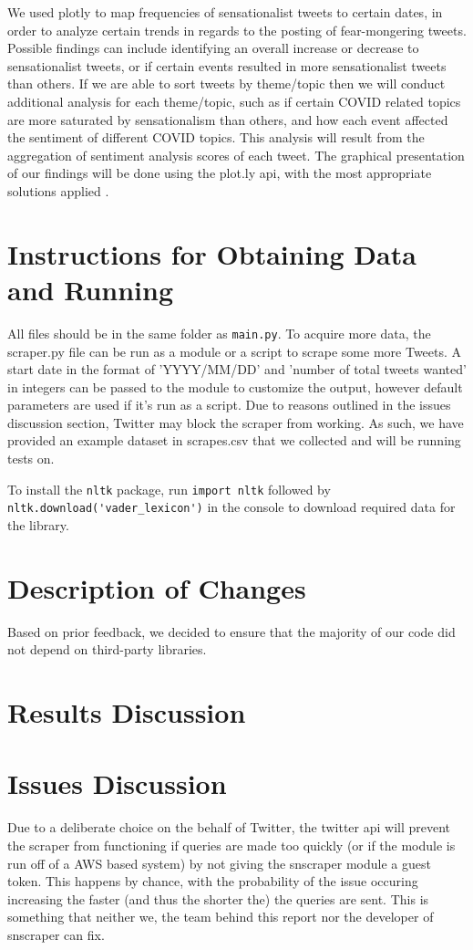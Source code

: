 \documentclass[fontsize=11pt]{article}
\begin{document}
We used plotly to map frequencies of sensationalist tweets to certain dates, in order to analyze certain trends in regards to the posting of fear-mongering tweets. Possible findings can include identifying an overall increase or decrease to sensationalist tweets, or if certain events resulted in more sensationalist tweets than others. If we are able to sort tweets by theme/topic then we will conduct additional analysis for each theme/topic, such as if certain COVID related topics are more saturated by sensationalism than others, and how each event affected the sentiment of different COVID topics. This analysis will result from the aggregation of sentiment analysis scores of each tweet. The graphical presentation of our findings will be done using the plot.ly api, with the most appropriate solutions applied \cite{plotly}.

\section*{Instructions for Obtaining Data and Running}
All files should be in the same folder as \verb|main.py|. To acquire more data, the scraper.py file can be run as a module or a script to scrape some more Tweets. A start date in the format of 'YYYY/MM/DD' and 'number of total tweets wanted' in integers can be passed to the module to customize the output, however default parameters are used if it's run as a script. Due to reasons outlined in the issues discussion section, Twitter may block the scraper from working. As such, we have provided an example dataset in scrapes.csv that we collected and will be running tests on.

To install the \verb|nltk| package, run \verb|import nltk| followed by \verb|nltk.download('vader_lexicon')| in the console to download required data for the library.
\section*{Description of Changes}
Based on prior feedback, we decided to ensure that the majority of our code did not depend on third-party libraries.
\section*{Results Discussion}
\section*{Issues Discussion}
Due to a deliberate choice on the behalf of Twitter, the twitter api will prevent the scraper from functioning if queries are made too quickly (or if the module is run off of a AWS based system) by not giving the snscraper module a guest token. This happens by chance, with the probability of the issue occuring increasing the faster (and thus the shorter the) the queries are sent. This is something that neither we, the team behind this report nor the developer of snscraper can fix.
\end{document}
